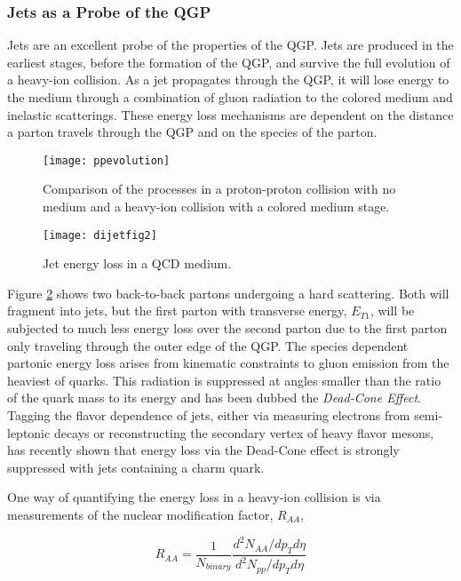 \subsubsection{Jets as a Probe of the QGP}

Jets are an excellent probe of the properties of the QGP.  Jets are produced in the earliest stages, before the formation of the QGP, and survive the full evolution of a heavy-ion collision.  As a jet propagates through the QGP, it will lose energy to the medium through a combination of gluon radiation to the colored medium and inelastic scatterings.  These energy loss mechanisms are dependent on the distance a parton travels through the QGP and on the species of the parton.  

\begin{figure}[h]
\texttt{[image: ppevolution]}
\centering
\caption{Comparison of the processes in a proton-proton collision with no medium and a heavy-ion collision with a colored medium stage\cite{PhysRevD.27.140}.}
\label{fig:HeavyIonCollisionvPP}
\end{figure}

\begin{figure}[h]
\texttt{[image: dijetfig2]}
\centering
\caption{Jet energy loss in a QCD medium\cite{Mohanty:2013yca}.}
\label{fig:JetEloss}
\end{figure}

\noindent
Figure \ref{fig:JetEloss} shows two back-to-back partons undergoing a hard scattering.  Both will fragment into jets, but the first parton with transverse energy, $E_{T1}$, will be subjected to much less energy loss over the second parton due to the first parton only traveling through the outer edge of the QGP.  The species dependent partonic energy loss arises from kinematic constraints to gluon emission from the heaviest of quarks.  This radiation is suppressed at angles smaller than the ratio of the quark mass to its energy and has been dubbed the \textit{Dead-Cone Effect}\cite{Thomas:2004ie}.  Tagging the flavor dependence of jets, either via measuring electrons from semi-leptonic decays or reconstructing the secondary vertex of heavy flavor mesons, has recently shown that energy loss via the Dead-Cone effect is strongly suppressed with jets containing a charm quark\cite{CAO2018255}.

One way of quantifying the energy loss in a heavy-ion collision is via measurements of the nuclear modification factor, $R_{AA}$,


\begin{equation}
R_{AA} = \frac{1}{N_{binary}} \frac{d^{2}N_{AA}/dp_{T}d\eta}{d^{2}N_{pp}/dp_{T}d\eta}
\label{eq:RAA}
\end{equation}

